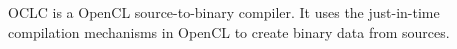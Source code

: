 OCLC is a Open\-CL source-to-binary compiler. It uses the just-in-time compilation mechanisms in Open\-CL to create binary data from sources. 